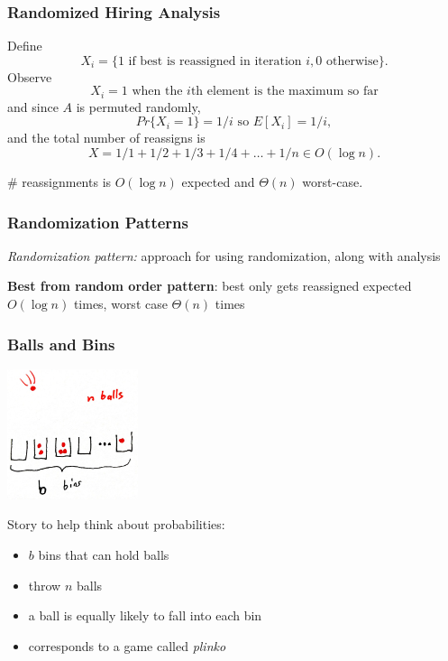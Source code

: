 \documentclass[10pt,aspectratio=169]{beamer}
\begin{document}
\begin{frame} \frametitle{Randomized Hiring Analysis}
Define
\[ X_i = \{\text{1 if best is reassigned in iteration } i, 0 \text{ otherwise} \} .\]
Observe
\[ X_i = 1 \text{ when the } i\text{th element is the maximum so far} \]
and since $A$ is permuted randomly,
\[ Pr\{X_i=1\} = 1/i \text{ so } E[X_i] = 1/i, \]
and the total number of reassigns is
\[ X = 1/1 + 1/2 + 1/3 + 1/4 + \ldots + 1/n \in O(\log n). \]

\# reassignments is $O(\log n)$ expected and $\Theta(n)$ worst-case.
\end{frame}


\begin{frame} \frametitle{Randomization Patterns}
\emph{Randomization pattern:} approach for using randomization, along with
analysis
\vspace{1cm}

\textbf{Best from random order pattern}: best only gets reassigned expected $O(\log n)$ times,
worst case $\Theta(n)$ times

\end{frame}

\begin{frame} \frametitle{Balls and Bins}
  \begin{center}
    \includegraphics[height=1.5in]{balls-bins.jpg}
  \end{center}

Story to help think about probabilities:
\begin{itemize}
  \item $b$ bins that can hold balls
  \item throw $n$ balls
  \item a ball is equally likely to fall into each bin
  \item corresponds to a game called \emph{plinko}
\end{itemize}
\end{frame}
\end{document}
